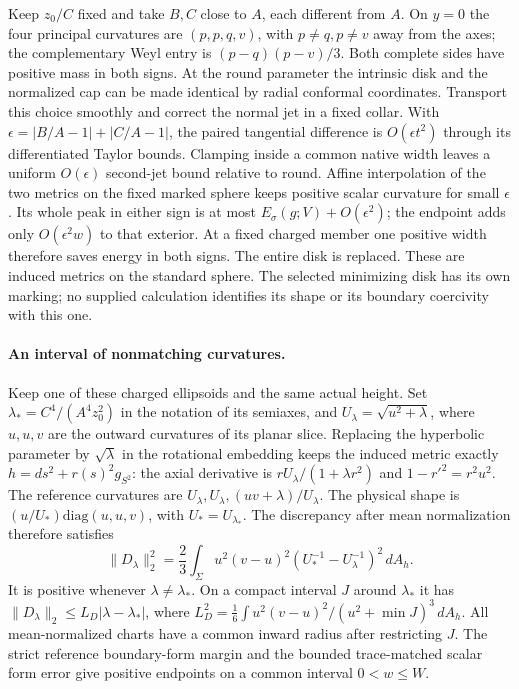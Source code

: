 \documentclass[11pt,letterpaper]{article}
\numberwithin{equation}{section}
\begin{document}
Keep \(z_0/C\) fixed and take \(B,C\) close to \(A\), each different
from \(A\). On \(y=0\) the four principal curvatures are
\((p,p,q,v)\), with \(p\ne q,p\ne v\) away from the axes; the
complementary Weyl entry is \((p-q)(p-v)/3\).
Both complete sides have positive mass in both signs.
At the round parameter the intrinsic disk and the normalized cap
can be made identical by radial conformal coordinates. Transport this
choice smoothly and correct the normal jet in a fixed collar. With
\(\epsilon=|B/A-1|+|C/A-1|\), the paired tangential difference is
\(O(\epsilon t^2)\) through its differentiated Taylor bounds.
Clamping inside a common native width leaves a uniform
\(O(\epsilon)\) second-jet bound relative to round. Affine
interpolation of the two metrics on the fixed marked sphere keeps
positive scalar curvature for small \(\epsilon\). Its whole peak in
either sign is at most \(E_\sigma(g;V)+O(\epsilon^2)\);
the endpoint adds only \(O(\epsilon^2w)\) to that exterior.
At a fixed charged member one positive width therefore saves energy
in both signs. The entire disk is replaced. These are induced
metrics on the standard sphere. The selected minimizing disk has
its own marking; no supplied calculation identifies its shape or
its boundary coercivity with this one.

\paragraph{An interval of nonmatching curvatures.}
Keep one of these charged ellipsoids and the same actual height.
Set \(\lambda_*=C^4/(A^4z_0^2)\) in the notation of its semiaxes,
and \(U_\lambda=\sqrt{u^2+\lambda}\), where \(u,u,v\) are the
outward curvatures of its planar slice. Replacing the hyperbolic
parameter by \(\sqrt\lambda\) in the rotational embedding keeps
the induced metric exactly \(h=ds^2+r(s)^2g_{S^2}\):
the axial derivative is \(rU_\lambda/(1+\lambda r^2)\) and
\(1-r'^2=r^2u^2\). The reference curvatures are
\(U_\lambda,U_\lambda,(uv+\lambda)/U_\lambda\).
The physical shape is \((u/U_*)\mathrm{diag}(u,u,v)\), with
\(U_*=U_{\lambda_*}\). The discrepancy after mean normalization
therefore satisfies
\[
 \|D_\lambda\|_2^2
 =\frac23\int_{\Sigma}u^2(v-u)^2
           (U_*^{-1}-U_\lambda^{-1})^2\,dA_h.
\]
It is positive whenever \(\lambda\ne\lambda_*\). On a compact
interval \(J\) around \(\lambda_*\) it has
\(\|D_\lambda\|_2\le L_D|\lambda-\lambda_*|\), where
\(L_D^2=\frac16\int u^2(v-u)^2/(u^2+\min J)^3\,dA_h\).
All mean-normalized charts have a common inward radius after
restricting \(J\). The strict reference boundary-form margin and
the bounded trace-matched scalar form error give positive endpoints
on a common interval \(0<w\le W\).
\end{document}

